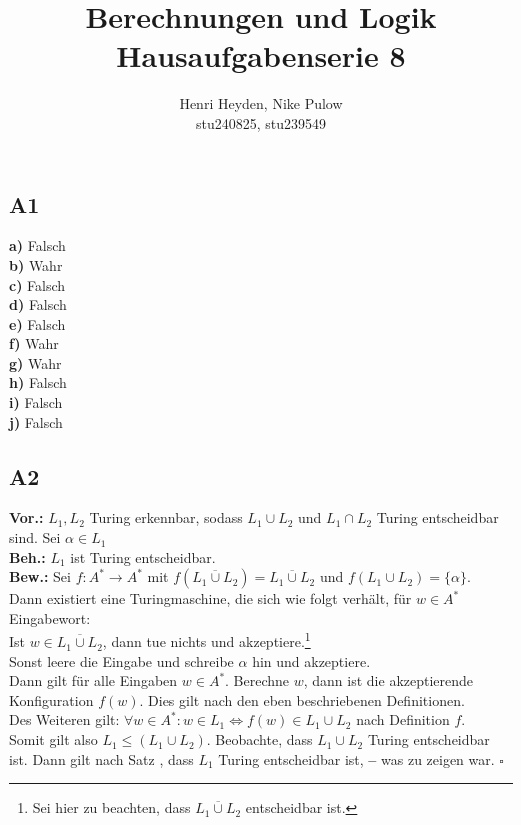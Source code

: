 \documentclass[12pt, a4paper]{article}
\title{Berechnungen und Logik\\Hausaufgabenserie 8}
\author{Henri Heyden, Nike Pulow \\ \small stu240825, stu239549}
\date{}
\newcommand*{\qed}{\null\nobreak\hfill\ensuremath{\square}}
\newcommand*{\gedanke}{\textbf{-- }}
\newcommand*{\gap}{\text{ }}
\newcommand*{\vor}{\textbf{Vor.:} \gap}
\newcommand*{\beh}{\textbf{Beh.:} \gap}
\newcommand*{\bew}{\textbf{Bew.:} \gap}
\begin{document}
\maketitle

\onehalfspacing
\vspace*{-2cm}
\subsection*{A1}
\textbf{a)} Falsch \\
\textbf{b)} Wahr \\
\textbf{c)} Falsch \\
\textbf{d)} Falsch \\
\textbf{e)} Falsch \\
\textbf{f)} Wahr \\
\textbf{g)} Wahr \\
\textbf{h)} Falsch \\
\textbf{i)} Falsch \\
\textbf{j)} Falsch
\subsection*{A2}
\vor \(L_1, L_2\) Turing erkennbar, sodass \(L_1 \cup L_2\) und \(L_1 \cap L_2\) Turing entscheidbar sind. Sei \(\alpha \in L_1\) \\
\beh \(L_1\) ist Turing entscheidbar. \\
\bew Sei \(f : A^* \rightarrow A^*\) mit \(f(\overline{L_1 \cup L_2}) = \overline{L_1 \cup L_2}\) und \(f(L_1 \cup L_2) = \{\alpha\}\). \\
Dann existiert eine Turingmaschine, die sich wie folgt verhält, für \(w \in A^*\) Eingabewort: \\
Ist \(w \in \overline{L_1 \cup L_2}\), dann tue nichts und akzeptiere.\footnote[1]{Sei hier zu beachten, dass \(\overline{L_1 \cup L_2}\) entscheidbar ist.} \\
Sonst leere die Eingabe und schreibe \(\alpha\) hin und akzeptiere. \\
Dann gilt für alle Eingaben \(w \in A^*\). Berechne \(w\), dann ist die akzeptierende Konfiguration \(f(w)\). Dies gilt nach den eben beschriebenen Definitionen. \\
Des Weiteren gilt: \(\forall w \in A^*: w \in L_1 \Leftrightarrow f(w) \in L_1 \cup L_2\) nach Definition \(f\). \\ Somit gilt also \(L_1 \le (L_1 \cup L_2)\). Beobachte, dass \(L_1 \cup L_2\) Turing entscheidbar ist.
Dann gilt nach Satz , dass \(L_1\) Turing entscheidbar ist, \gedanke was zu zeigen war. \qed
\end{document}
